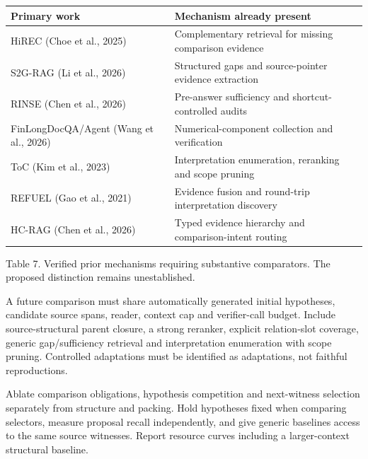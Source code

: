 \documentclass[11pt]{article}
\begin{document}
{\small

\begin{longtable}{>{\raggedright\arraybackslash}p{}>{\raggedright\arraybackslash}p{}}

\toprule

\textbf{Primary work} & \textbf{Mechanism already present} \\

\midrule\endhead

HiREC (Choe et al., 2025) & Complementary retrieval for missing comparison evidence \\

S2G-RAG (Li et al., 2026) & Structured gaps and source-pointer evidence extraction \\

RINSE (Chen et al., 2026) & Pre-answer sufficiency and shortcut-controlled audits \\

FinLongDocQA/Agent (Wang et al., 2026) & Numerical-component collection and verification \\

ToC (Kim et al., 2023) & Interpretation enumeration, reranking and scope pruning \\

REFUEL (Gao et al., 2021) & Evidence fusion and round-trip interpretation discovery \\

HC-RAG (Chen et al., 2026) & Typed evidence hierarchy and comparison-intent routing \\

\bottomrule

\end{longtable}

}

{\small Table 7. Verified prior mechanisms requiring substantive comparators. The proposed distinction remains unestablished.}

A future comparison must share automatically generated initial hypotheses, candidate source spans, reader, context cap and verifier-call budget. Include source-structural parent closure, a strong reranker, explicit relation-slot coverage, generic gap/sufficiency retrieval and interpretation enumeration with scope pruning. Controlled adaptations must be identified as adaptations, not faithful reproductions.


Ablate comparison obligations, hypothesis competition and next-witness selection separately from structure and packing. Hold hypotheses fixed when comparing selectors, measure proposal recall independently, and give generic baselines access to the same source witnesses. Report resource curves including a larger-context structural baseline.
\end{document}
